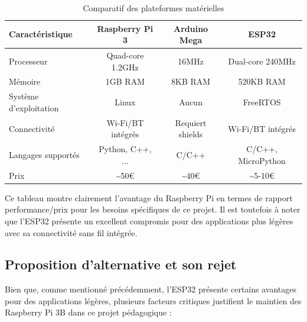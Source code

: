 \documentclass[a4paper, 12pt]{article}
\begin{document}
	\begin{table}[h]
		\centering
		\caption{Comparatif des plateformes matérielles}
		\begin{tabular}{|l|c|c|c|}
			\hline
			\textbf{Caractéristique} & \textbf{Raspberry Pi 3} & \textbf{Arduino Mega} & \textbf{ESP32} \\
			\hline
			Processeur & Quad-core 1.2GHz & 16MHz & Dual-core 240MHz \\
			\hline
			Mémoire & 1GB RAM & 8KB RAM & 520KB RAM \\
			\hline
			Système d'exploitation & Linux & Aucun & FreeRTOS \\
			\hline
			Connectivité & Wi-Fi/BT intégrés & Requiert shields & Wi-Fi/BT intégrés \\
			\hline
			Langages supportés & Python, C++, ... & C/C++ & C/C++, MicroPython \\
			\hline
			Prix & \textasciitilde50€ & \textasciitilde40€ & \textasciitilde5-10€ \\
			\hline
		\end{tabular}
	\end{table}
	
	Ce tableau montre clairement l'avantage du Raspberry Pi en termes de rapport performance/prix pour les besoins spécifiques de ce projet. Il est toutefois à noter que l'ESP32 présente un excellent compromis pour des applications plus légères avec sa connectivité sans fil intégrée.
	
	\subsection{Proposition d'alternative et son rejet}
	
	Bien que, comme mentionné précédemment, l’ESP32 présente certains avantages pour des applications légères, plusieurs facteurs critiques justifient le maintien des Raspberry Pi 3B dans ce projet pédagogique :
	
\end{document}
